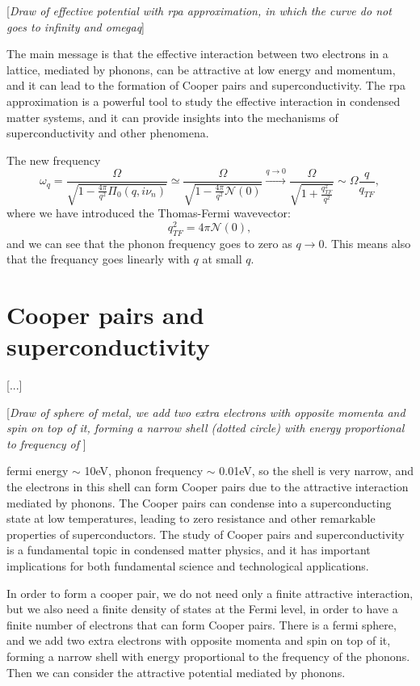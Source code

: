     [\textit{Draw of effective potential with rpa approximation, in which the curve do not goes to infinity and omegaq}]

The main message is that the effective interaction between two electrons in a lattice, mediated by phonons, can be attractive at low energy and momentum, and it can lead to the formation of Cooper pairs and superconductivity. The rpa approximation is a powerful tool to study the effective interaction in condensed matter systems, and it can provide insights into the mechanisms of superconductivity and other phenomena.

The new frequency
\[
    \omega_q = \frac{\Omega}{\sqrt{1 - \frac{4\pi}{q^2} \Pi_0(q,i \nu_n)}} \simeq \frac{\Omega}{\sqrt{1 - \frac{4\pi}{q^2} \mathcal{N}(0)}} \xrightarrow{q \to 0} \frac{\Omega}{\sqrt{1 + \frac{q_{TF}^2}{q^2}}} \sim \Omega \frac{q}{q_{TF}},
\]
where we have introduced the Thomas-Fermi wavevector:
\[
    q_{TF}^2 = 4\pi \mathcal{N}(0),
\]
and we can see that the phonon frequency goes to zero as $q \to 0$. This means also that the frequancy goes linearly with $q$ at small $q$.


\section{Cooper pairs and superconductivity}

 [...]

 [\textit{Draw of sphere of metal, we add two extra electrons with opposite momenta and spin on top of it, forming a narrow shell (dotted circle) with energy proportional to frequency of }]

fermi energy \(\sim \) 10eV, phonon frequency \(\sim\) 0.01eV, so the shell is very narrow, and the electrons in this shell can form Cooper pairs due to the attractive interaction mediated by phonons. The Cooper pairs can condense into a superconducting state at low temperatures, leading to zero resistance and other remarkable properties of superconductors. The study of Cooper pairs and superconductivity is a fundamental topic in condensed matter physics, and it has important implications for both fundamental science and technological applications.

In order to form a cooper pair, we do not need only a finite attractive interaction, but we also need a finite density of states at the Fermi level, in order to have a finite number of electrons that can form Cooper pairs. There is a fermi sphere, and we add two extra electrons with opposite momenta and spin on top of it, forming a narrow shell with energy proportional to the frequency of the phonons. Then we can consider the attractive potential mediated by phonons.

